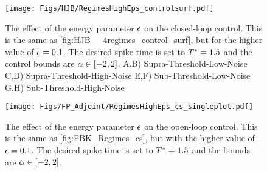 \begin{figure}[htp]
\begin{center}
  \texttt{[image: Figs/HJB/RegimesHighEps\_controlsurf.pdf]}
  \caption[Value Function solution with higher energy-penalty]{The effect of the
  energy parameter ${\epsilon}$ on the closed-loop control. This is the same as \cref{fig:HJB__4regimes_control_surf}, but for
  the higher value of ${\epsilon} = 0.1$.
  The desired spike time is set to
  ${ T^* }=1.5$ and the control bounds are $\alpha \in [-2,2]$. 
  A,B)
   Supra-Threshold-Low-Noise 
  C,D) 
   Supra-Threshold-High-Noise 
  E,F)
   Sub-Threshold-Low-Noise 
  G,H)
   Sub-Threshold-High-Noise}
\label{fig:HJB_4regimes_control_different_eps} 
\end{center}
\end{figure}
\begin{figure}[htp]
\begin{center}
  \texttt{[image: Figs/FP\_Adjoint/RegimesHighEps\_cs\_singleplot.pdf]}
  \caption[Open-loop Optimal Control solution for higher energy penalty]{The
  effect of the energy parameter ${\epsilon}$ on the open-loop control. This is the same as \cref{fig:FBK_Regimes_cs}, but with the higher
  value of ${\epsilon} =0.1$. 
  The desired spike time is set to ${ T^* }=1.5$ and the bounds are $\alpha \in [-2,2]$.}
    \label{fig:FBK_Regimes_cs_different_es} 
\end{center}
\end{figure}

% 


